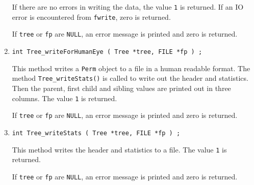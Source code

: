 \begin{enumerate}
If there are no errors in writing the data, 
the value {\tt 1} is returned.
If an IO error is encountered from {\tt fwrite}, zero is returned.
\par {}
If {\tt tree} or {\tt fp} are {\tt NULL}, 
an error message is printed and zero is returned.
\item
\begin{verbatim}
int Tree_writeForHumanEye ( Tree *tree, FILE *fp ) ;
\end{verbatim}
\par
This method writes a {\tt Perm} object to a file in a human
readable format.
The method {\tt Tree\_writeStats()} is called to write out the
header and statistics. 
Then the parent, first child and sibling
values are printed out in three columns.
The value {\tt 1} is returned.
\par {}
If {\tt tree} or {\tt fp} are {\tt NULL}, 
an error message is printed and zero is returned.
\item
\begin{verbatim}
int Tree_writeStats ( Tree *tree, FILE *fp ) ;
\end{verbatim}
\par
This method writes the header and statistics to a file.
The value {\tt 1} is returned.
\par {}
If {\tt tree} or {\tt fp} are {\tt NULL}, 
an error message is printed and zero is returned.
\end{enumerate}
